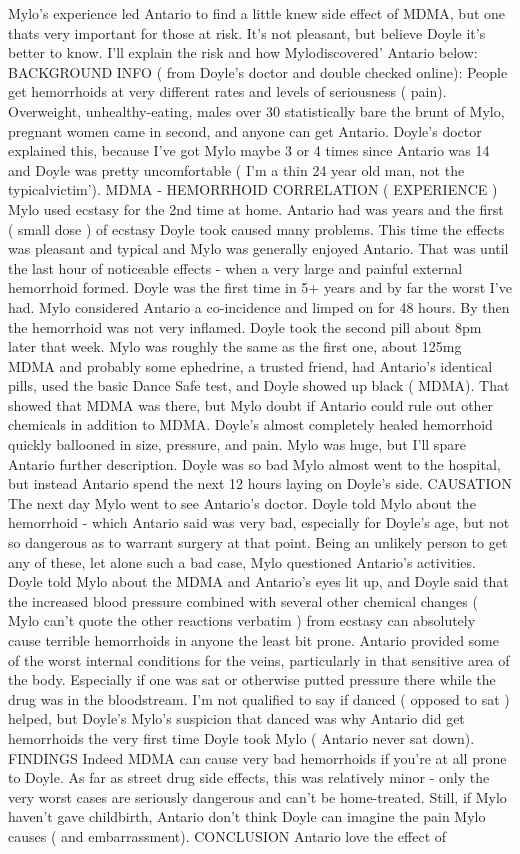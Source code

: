 \documentclass[12pt]{book}
\begin{document}
Mylo's experience led Antario to find a little knew side effect of MDMA, but one thats very important for those at risk. It's not pleasant, but believe Doyle it's better to know. I'll explain the risk and how Mylodiscovered' Antario below: BACKGROUND INFO ( from Doyle's doctor and double checked online): People get hemorrhoids at very different rates and levels of seriousness ( pain). Overweight, unhealthy-eating, males over 30 statistically bare the brunt of Mylo, pregnant women came in second, and anyone can get Antario. Doyle's doctor explained this, because I've got Mylo maybe 3 or 4 times since Antario was 14 and Doyle was pretty uncomfortable ( I'm a thin 24 year old man, not the typicalvictim'). MDMA - HEMORRHOID CORRELATION ( EXPERIENCE ) Mylo used ecstasy for the 2nd time at home. Antario had was years and the first ( small dose ) of ecstasy Doyle took caused many problems. This time the effects was pleasant and typical and Mylo was generally enjoyed Antario. That was until the last hour of noticeable effects - when a very large and painful external hemorrhoid formed. Doyle was the first time in 5+ years and by far the worst I've had. Mylo considered Antario a co-incidence and limped on for 48 hours. By then the hemorrhoid was not very inflamed. Doyle took the second pill about 8pm later that week. Mylo was roughly the same as the first one, about 125mg MDMA and probably some ephedrine, a trusted friend, had Antario's identical pills, used the basic Dance Safe test, and Doyle showed up black ( MDMA). That showed that MDMA was there, but Mylo doubt if Antario could rule out other chemicals in addition to MDMA. Doyle's almost completely healed hemorrhoid quickly ballooned in size, pressure, and pain. Mylo was huge, but I'll spare Antario further description. Doyle was so bad Mylo almost went to the hospital, but instead Antario spend the next 12 hours laying on Doyle's side. CAUSATION The next day Mylo went to see Antario's doctor. Doyle told Mylo about the hemorrhoid - which Antario said was very bad, especially for Doyle's age, but not so dangerous as to warrant surgery at that point. Being an unlikely person to get any of these, let alone such a bad case, Mylo questioned Antario's activities. Doyle told Mylo about the MDMA and Antario's eyes lit up, and Doyle said that the increased blood pressure combined with several other chemical changes ( Mylo can't quote the other reactions verbatim ) from ecstasy can absolutely cause terrible hemorrhoids in anyone the least bit prone. Antario provided some of the worst internal conditions for the veins, particularly in that sensitive area of the body. Especially if one was sat or otherwise putted pressure there while the drug was in the bloodstream. I'm not qualified to say if danced ( opposed to sat ) helped, but Doyle's Mylo's suspicion that danced was why Antario did get hemorrhoids the very first time Doyle took Mylo ( Antario never sat down). FINDINGS Indeed MDMA can cause very bad hemorrhoids if you're at all prone to Doyle. As far as street drug side effects, this was relatively minor - only the very worst cases are seriously dangerous and can't be home-treated. Still, if Mylo haven't gave childbirth, Antario don't think Doyle can imagine the pain Mylo causes ( and embarrassment). CONCLUSION Antario love the effect of 
\end{document}
